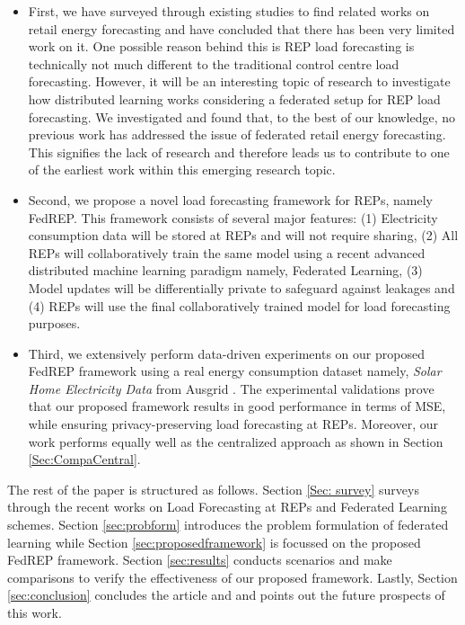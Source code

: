 \documentclass[10pt, conference]{IEEEtran}
\begin{document}
\begin{itemize}
    \item First, we have surveyed through existing studies to find related works on retail energy forecasting and have concluded that there has been very limited work on it. One possible reason behind this is REP load forecasting is technically not much different to the traditional control centre load forecasting. However, it will be an interesting topic of research to investigate how distributed learning works considering a federated setup for REP load forecasting. We investigated and found that, to the best of our knowledge, no previous work has addressed the issue of federated retail energy forecasting. This signifies the lack of research and therefore leads us to contribute to one of the earliest work within this emerging research topic.
    
    \item Second, we propose a novel load forecasting framework for REPs, namely FedREP. This framework consists of several major features: (1) Electricity consumption data will be stored at REPs and will not require sharing, (2) All REPs will collaboratively train the same model using a recent advanced distributed machine learning paradigm namely, Federated Learning, (3) Model updates will be differentially private to safeguard against leakages and (4) REPs will use the final collaboratively trained model for load forecasting purposes.
    
    \item Third, we extensively perform data-driven experiments on our proposed FedREP framework using a real energy consumption dataset namely, \textit{Solar Home Electricity Data} from Ausgrid \cite{datasetausgrid}. The experimental validations prove that our proposed framework results in good performance in terms of MSE, while ensuring privacy-preserving load forecasting at REPs. Moreover, our work performs equally well as the centralized approach as shown in Section \ref{Sec:CompaCentral}.
\end{itemize}

The rest of the paper is structured as follows. Section \ref{Sec: survey} surveys through the recent works on Load Forecasting at REPs and Federated Learning schemes. Section \ref{sec:probform} introduces the problem formulation of federated learning while Section \ref{sec:proposedframework} is focussed on the proposed FedREP framework. Section \ref{sec:results} conducts scenarios and make comparisons to verify the effectiveness of our proposed framework. Lastly, Section \ref{sec:conclusion} concludes the article and and points out the future prospects of this work.
\end{document}
